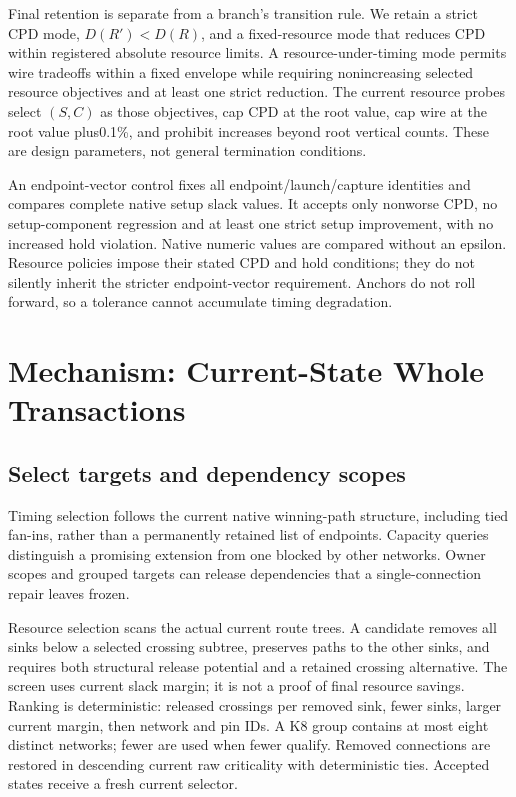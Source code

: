 \documentclass[conference,10pt]{IEEEtran}
\begin{document}
Final retention is separate from a branch's transition rule. We retain a strict CPD mode, $D(R')<D(R)$, and a fixed-resource mode that reduces CPD within registered absolute resource limits. A resource-under-timing mode permits wire tradeoffs within a fixed envelope while requiring nonincreasing selected resource objectives and at least one strict reduction. The current resource probes select $(S,C)$ as those objectives, cap CPD at the root value, cap wire at the root value plus0.1\%, and prohibit increases beyond root vertical counts. These are design parameters, not general termination conditions.

An endpoint-vector control fixes all endpoint/launch/capture identities and compares complete native setup slack values. It accepts only nonworse CPD, no setup-component regression and at least one strict setup improvement, with no increased hold violation. Native numeric values are compared without an epsilon. Resource policies impose their stated CPD and hold conditions; they do not silently inherit the stricter endpoint-vector requirement. Anchors do not roll forward, so a tolerance cannot accumulate timing degradation.

\section{Mechanism: Current-State Whole Transactions}
\subsection{Select targets and dependency scopes}
Timing selection follows the current native winning-path structure, including tied fan-ins, rather than a permanently retained list of endpoints. Capacity queries distinguish a promising extension from one blocked by other networks. Owner scopes and grouped targets can release dependencies that a single-connection repair leaves frozen.

Resource selection scans the actual current route trees. A candidate removes all sinks below a selected crossing subtree, preserves paths to the other sinks, and requires both structural release potential and a retained crossing alternative. The screen uses current slack margin; it is not a proof of final resource savings. Ranking is deterministic: released crossings per removed sink, fewer sinks, larger current margin, then network and pin IDs. A K8 group contains at most eight distinct networks; fewer are used when fewer qualify. Removed connections are restored in descending current raw criticality with deterministic ties. Accepted states receive a fresh current selector.
\end{document}
